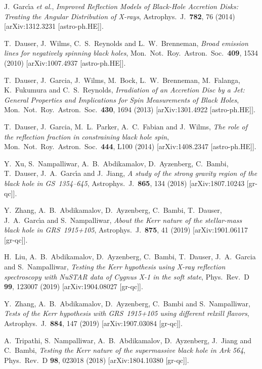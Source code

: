 \documentclass[11pt,a4paper,pdftex]{article}
\begin{document}
\begin{thebibliography}{99}
  J.~Garc{\'\i}a {\it et al.},
  {\it Improved Reflection Models of Black-Hole Accretion Disks: Treating the Angular Distribution of X-rays},
  Astrophys.\ J.\  {\bf 782}, 76 (2014)
  [arXiv:1312.3231 [astro-ph.HE]].

  T.~Dauser, J.~Wilms, C.~S.~Reynolds and L.~W.~Brenneman,
  {\it Broad emission lines for negatively spinning black holes},
  Mon.\ Not.\ Roy.\ Astron.\ Soc.\  {\bf 409}, 1534 (2010)
  [arXiv:1007.4937 [astro-ph.HE]].

  T.~Dauser, J.~Garcia, J.~Wilms, M.~Bock, L.~W.~Brenneman, M.~Falanga, K.~Fukumura and C.~S.~Reynolds,
  {\it Irradiation of an Accretion Disc by a Jet: General Properties and Implications for Spin Measurements of Black Holes},
  Mon.\ Not.\ Roy.\ Astron.\ Soc.\  {\bf 430}, 1694 (2013)
  [arXiv:1301.4922 [astro-ph.HE]].

  T.~Dauser, J.~Garcia, M.~L.~Parker, A.~C.~Fabian and J.~Wilms,
  {\it The role of the reflection fraction in constraining black hole spin},
  Mon.\ Not.\ Roy.\ Astron.\ Soc.\  {\bf 444}, L100 (2014)
  [arXiv:1408.2347 [astro-ph.HE]].  
  
  Y.~Xu, S.~Nampalliwar, A.~B.~Abdikamalov, D.~Ayzenberg, C.~Bambi, T.~Dauser, J.~A.~Garc{\'\i}a and J.~Jiang, 
  {\it A study of the strong gravity region of the black hole in GS~1354--645},
  Astrophys.\ J.\  {\bf 865}, 134 (2018)
  [arXiv:1807.10243 [gr-qc]].
  
Y.~Zhang, A.~B.~Abdikamalov, D.~Ayzenberg, C.~Bambi, T.~Dauser, J.~A.~Garc{\'\i}a and S.~Nampalliwar, 
{\it About the Kerr nature of the stellar-mass black hole in GRS~1915+105},
  Astrophys.\ J.\  {\bf 875}, 41 (2019)
  [arXiv:1901.06117 [gr-qc]].
  
    H.~Liu, A.~B.~Abdikamalov, D.~Ayzenberg, C.~Bambi, T.~Dauser, J.~A.~Garcia and S.~Nampalliwar,
  {\it Testing the Kerr hypothesis using X-ray reflection spectroscopy with NuSTAR data of Cygnus X-1 in the soft state},
  Phys.\ Rev.\ D {\bf 99}, 123007 (2019)
  [arXiv:1904.08027 [gr-qc]].
  
    Y.~Zhang, A.~B.~Abdikamalov, D.~Ayzenberg, C.~Bambi and S.~Nampalliwar,
    {\it Tests of the Kerr hypothesis with GRS~1915+105 using different {\sc relxill} flavors},
  Astrophys.\ J.\  {\bf 884}, 147 (2019)
  [arXiv:1907.03084 [gr-qc]].  

  A.~Tripathi, S.~Nampalliwar, A.~B.~Abdikamalov, D.~Ayzenberg, J.~Jiang and C.~Bambi,
  {\it Testing the Kerr nature of the supermassive black hole in Ark 564},
  Phys.\ Rev.\ D {\bf 98}, 023018 (2018)
  [arXiv:1804.10380 [gr-qc]].  
  

\end{thebibliography}
\end{document}
